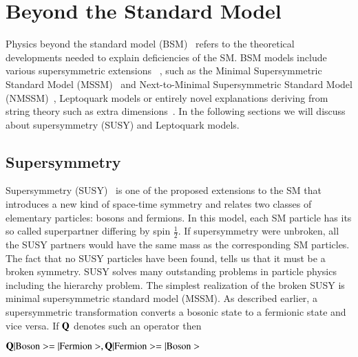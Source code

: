 \setcounter{section}{3}
\setcounter{subsection}{3}
\setcounter{subsubsection}{3}
\setcounter{equation}{3}
\chapter{Beyond the Standard Model  \label{Beyond the Standard Model}}
Physics beyond the standard model (BSM)~\cite{bsm} refers to the theoretical developments needed to explain deficiencies of the SM. BSM models include various supersymmetric extensions ~\cite{SUSYprimer}, such as the Minimal Supersymmetric Standard Model (MSSM)~\cite{MSSMref} and Next-to-Minimal Supersymmetric Standard Model (NMSSM)~\cite{NMSSMref}, Leptoquark models or entirely novel explanations deriving from string theory such as extra dimensions~\cite{extra-dim}. In the following sections we will discuss about supersymmetry (SUSY) and Leptoquark models. 

\section{Supersymmetry}
Supersymmetry (SUSY)~\cite{SUSYprimer} is one of the proposed extensions to the SM that introduces a new kind of space-time symmetry and relates two classes of elementary particles: bosons and fermions. In this model, each SM particle has its so called superpartner differing by spin $\frac{1}{2}$. If supersymmetry were unbroken, all the SUSY partners would have the same mass as the corresponding SM particles. The fact that no SUSY particles have been found, tells us that it must be a broken symmetry. SUSY solves many outstanding problems in particle physics including the hierarchy problem. The simplest realization of the broken SUSY is minimal supersymmetric standard model (MSSM). As described earlier, a supersymmetric transformation converts a bosonic state to a fermionic state and vice versa. If ${\rm \bf Q}$ denotes such an operator then 

 $\rm {\bf Q}| Boson>  =  | Fermion>, {\bf Q}| Fermion> =  | Boson> $

